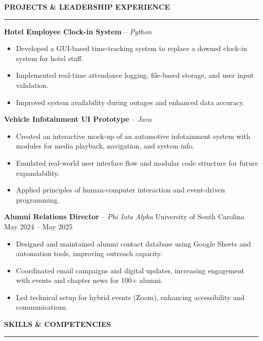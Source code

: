 \documentclass[10.5pt, letterpaper]{article}
\newcommand{\ressection}[1]{%
  \vspace{6pt}
  \noindent\textbf{#1}
  \vspace{1pt}
  \hrule
  \vspace{4pt}
}
\begin{document}
\vspace{4pt}

\ressection{PROJECTS \& LEADERSHIP EXPERIENCE}

\noindent\textbf{Hotel Employee Clock-in System} -- \textit{Python}
\begin{itemize}[leftmargin=1.5em, itemsep=1pt, topsep=2pt]
  \item Developed a GUI-based time-tracking system to replace a downed clock-in system for hotel staff.
  \item Implemented real-time attendance logging, file-based storage, and user input validation.
  \item Improved system availability during outages and enhanced data accuracy.
\end{itemize}

\vspace{4pt}
\noindent\textbf{Vehicle Infotainment UI Prototype} -- \textit{Java}
\begin{itemize}[leftmargin=1.5em, itemsep=1pt, topsep=2pt]
  \item Created an interactive mock-up of an automotive infotainment system with modules for media playback, navigation, and system info.
  \item Emulated real-world user interface flow and modular code structure for future expandability.
  \item Applied principles of human-computer interaction and event-driven programming.
\end{itemize}

\vspace{4pt}
\noindent\textbf{Alumni Relations Director} -- \textit{Phi Iota Alpha} \textbar{} University of South Carolina \textbar{} May 2024 -- May 2025
\begin{itemize}[leftmargin=1.5em, itemsep=1pt, topsep=2pt]
  \item Designed and maintained alumni contact database using Google Sheets and automation tools, improving outreach capacity.
  \item Coordinated email campaigns and digital updates, increasing engagement with events and chapter news for 100+ alumni.
  \item Led technical setup for hybrid events (Zoom), enhancing accessibility and communications.
\end{itemize}

\vspace{4pt}

\ressection{SKILLS \& COMPETENCIES}
\end{document}
